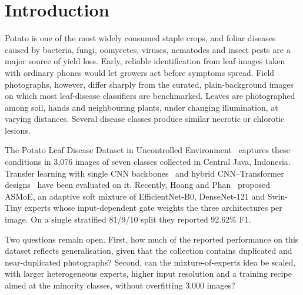 \section{Introduction}\label{sec:intro}

Potato is one of the most widely consumed staple crops, and foliar diseases caused by bacteria,
fungi, oomycetes, viruses, nematodes and insect pests are a major source of yield loss. Early,
reliable identification from leaf images taken with ordinary phones would let growers act before
symptoms spread. Field photographs, however, differ sharply from the curated, plain-background images
on which most leaf-disease classifiers are benchmarked. Leaves are photographed among soil, hands and
neighbouring plants, under changing illumination, at varying distances. Several disease classes
produce similar necrotic or chlorotic lesions.

The Potato Leaf Disease Dataset in Uncontrolled Environment~\cite{shabrina2024dataset} captures
these conditions in 3{,}076 images of seven classes collected in Central Java, Indonesia. Transfer
learning with single CNN backbones~\cite{shabrina2024dataset} and hybrid CNN--Transformer
designs~\cite{saleh2025hybrid} have been evaluated on it. Recently, Hoang and
Phan~\cite{hoang2026asmoe} proposed ASMoE, an adaptive soft mixture of EfficientNet-B0, DenseNet-121
and Swin-Tiny experts whose input-dependent gate weights the three architectures per image. On a
single stratified 81/9/10 split they reported 92.62\% F1.

Two questions remain open. First, how much of the reported performance on this dataset reflects
generalisation, given that the collection contains duplicated and near-duplicated photographs?
Second, can the mixture-of-experts idea be scaled, with larger heterogeneous experts, higher input
resolution and a training recipe aimed at the minority classes, without overfitting 3{,}000 images?

